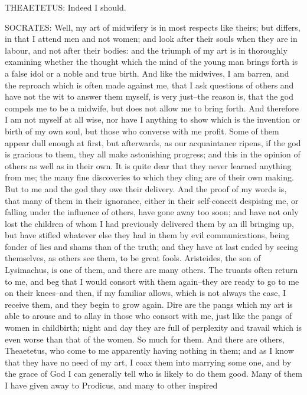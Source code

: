 THEAETETUS: Indeed I should.

SOCRATES: Well, my art of midwifery is in most respects like theirs; but
differs, in that I attend men and not women; and look after their souls
when they are in labour, and not after their bodies: and the triumph of
my art is in thoroughly examining whether the thought which the mind of
the young man brings forth is a false idol or a noble and true birth.
And like the midwives, I am barren, and the reproach which is often
made against me, that I ask questions of others and have not the wit to
answer them myself, is very just--the reason is, that the god compels me
to be a midwife, but does not allow me to bring forth. And therefore
I am not myself at all wise, nor have I anything to show which is
the invention or birth of my own soul, but those who converse with me
profit. Some of them appear dull enough at first, but afterwards, as
our acquaintance ripens, if the god is gracious to them, they all make
astonishing progress; and this in the opinion of others as well as in
their own. It is quite dear that they never learned anything from me;
the many fine discoveries to which they cling are of their own making.
But to me and the god they owe their delivery. And the proof of my words
is, that many of them in their ignorance, either in their self-conceit
despising me, or falling under the influence of others, have gone away
too soon; and have not only lost the children of whom I had previously
delivered them by an ill bringing up, but have stifled whatever else
they had in them by evil communications, being fonder of lies and shams
than of the truth; and they have at last ended by seeing themselves, as
others see them, to be great fools. Aristeides, the son of Lysimachus,
is one of them, and there are many others. The truants often return to
me, and beg that I would consort with them again--they are ready to
go to me on their knees--and then, if my familiar allows, which is not
always the case, I receive them, and they begin to grow again. Dire
are the pangs which my art is able to arouse and to allay in those who
consort with me, just like the pangs of women in childbirth; night and
day they are full of perplexity and travail which is even worse than
that of the women. So much for them. And there are others, Theaetetus,
who come to me apparently having nothing in them; and as I know that
they have no need of my art, I coax them into marrying some one, and
by the grace of God I can generally tell who is likely to do them good.
Many of them I have given away to Prodicus, and many to other inspired
